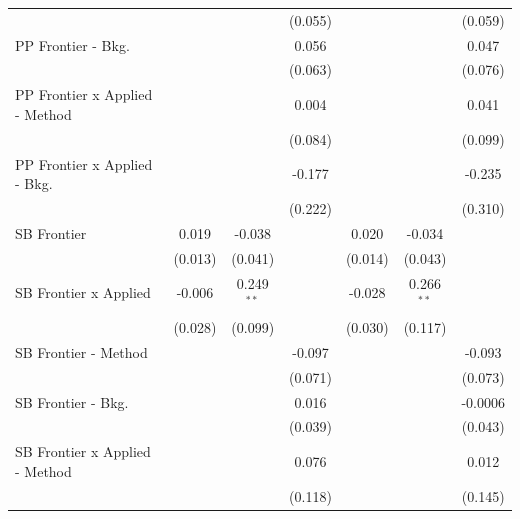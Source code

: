 \begin{tabular}{lcccccc}
                                  &               &              & (0.055) &                &              & (0.059)\\   
   PP Frontier - Bkg.             &               &              & 0.056   &                &              & 0.047\\   
                                  &               &              & (0.063) &                &              & (0.076)\\   
   PP Frontier x Applied - Method &               &              & 0.004   &                &              & 0.041\\   
                                  &               &              & (0.084) &                &              & (0.099)\\   
   PP Frontier x Applied - Bkg.   &               &              & -0.177  &                &              & -0.235\\   
                                  &               &              & (0.222) &                &              & (0.310)\\   
   SB Frontier                    & 0.019         & -0.038       &         & 0.020          & -0.034       &   \\   
                                  & (0.013)       & (0.041)      &         & (0.014)        & (0.043)      &   \\   
   SB Frontier x Applied          & -0.006        & 0.249$^{**}$ &         & -0.028         & 0.266$^{**}$ &   \\   
                                  & (0.028)       & (0.099)      &         & (0.030)        & (0.117)      &   \\   
   SB Frontier - Method           &               &              & -0.097  &                &              & -0.093\\   
                                  &               &              & (0.071) &                &              & (0.073)\\   
   SB Frontier - Bkg.             &               &              & 0.016   &                &              & -0.0006\\   
                                  &               &              & (0.039) &                &              & (0.043)\\   
   SB Frontier x Applied - Method &               &              & 0.076   &                &              & 0.012\\   
                                  &               &              & (0.118) &                &              & (0.145)\\   

\end{tabular}
